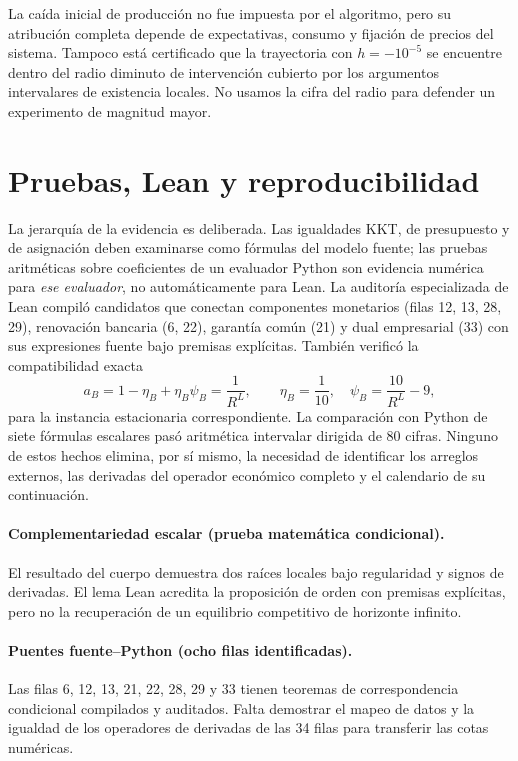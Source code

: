La caída inicial de producción no fue impuesta por el algoritmo,
pero su atribución completa depende de expectativas, consumo
y fijación de precios del sistema. Tampoco está certificado
que la trayectoria con \(h=-10^{-5}\) se encuentre dentro
del radio diminuto de intervención cubierto por los argumentos
intervalares de existencia locales. No usamos la cifra del
radio para defender un experimento de magnitud mayor.

\section{Pruebas, Lean y reproducibilidad}\label{sec:compact_proofs}
La jerarquía de la evidencia es deliberada. Las igualdades
KKT, de presupuesto y de asignación deben examinarse como
fórmulas del modelo fuente; las pruebas aritméticas sobre
coeficientes de un evaluador Python son evidencia numérica
para \emph{ese evaluador}, no automáticamente para Lean.
La auditoría especializada de Lean compiló candidatos que
conectan componentes monetarios (filas 12, 13, 28, 29),
renovación bancaria (6, 22), garantía común (21) y dual
empresarial (33) con sus expresiones fuente bajo premisas
explícitas. También verificó la compatibilidad exacta
\[
a_B=1-\eta_B+\eta_B\psi_B
=\frac{1}{R^L},
\qquad \eta_B=\frac{1}{10},
\quad \psi_B=\frac{10}{R^L}-9,
\]
para la instancia estacionaria correspondiente. La
comparación con Python de siete fórmulas escalares pasó
aritmética intervalar dirigida de 80 cifras. Ninguno de
estos hechos elimina, por sí mismo, la necesidad de
identificar los arreglos externos, las derivadas del operador
económico completo y el calendario de su continuación.

\paragraph{Complementariedad escalar (prueba matemática condicional).}
El resultado del cuerpo demuestra dos raíces locales bajo regularidad
y signos de derivadas. El lema Lean acredita la proposición de orden
con premisas explícitas, pero no la recuperación de un equilibrio
competitivo de horizonte infinito.

\paragraph{Puentes fuente--Python (ocho filas identificadas).}
Las filas 6, 12, 13, 21, 22, 28, 29 y 33 tienen teoremas de
correspondencia condicional compilados y auditados. Falta demostrar
el mapeo de datos y la igualdad de los operadores de derivadas
de las 34 filas para transferir las cotas numéricas.

